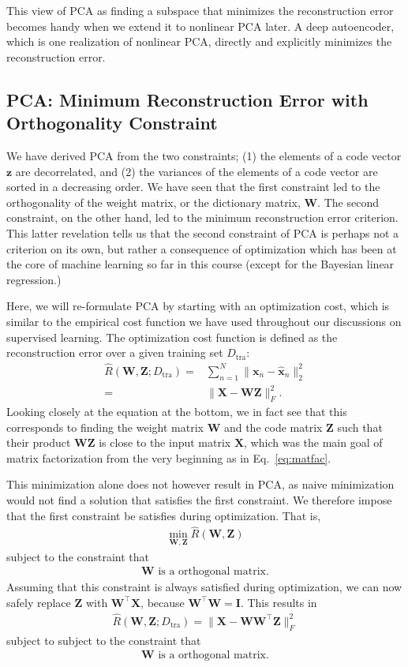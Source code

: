 \documentclass{report}
\newcommand{\vect}[1]{\mathbf{#1}}
\newcommand{\matr}[1]{\mathbf{#1}}
\newcommand{\vx}[0]{\vect{x}}
\newcommand{\vz}[0]{\vect{z}}
\newcommand{\mW}[0]{\matr{W}}
\newcommand{\mZ}[0]{\matr{Z}}
\newcommand{\mX}[0]{\matr{X}}
\newcommand{\mI}{\matr{I}}
\newcommand{\tra}{\text{tra}}
\begin{document}
This view of PCA as finding a subspace that minimizes the reconstruction error
becomes handy when we extend it to nonlinear PCA later. A deep autoencoder,
which is one realization of nonlinear PCA, directly and explicitly minimizes the
reconstruction error.


\subsection{PCA: Minimum Reconstruction Error with Orthogonality Constraint}

We have derived PCA from the two constraints; (1) the elements of a code vector
$\vz$ are decorrelated, and (2) the variances of the elements of a code vector
are sorted in a decreasing order. We have seen that the first constraint led to
the orthogonality of the weight matrix, or the dictionary matrix, $\mW$. The
second constraint, on the other hand, led to the minimum reconstruction error
criterion. This latter revelation tells us that the second constraint of PCA is
perhaps not a criterion on its own, but rather a consequence of optimization
which has been at the core of machine learning so far in this course (except for
the Bayesian linear regression.) 

Here, we will re-formulate PCA by starting with an optimization cost, which
is similar to the empirical cost function we have used throughout our
discussions on supervised learning. The optimization cost function is
defined as the reconstruction error over a given training set $D_{\tra}$:
\begin{align*}
    \hat{R}(\mW, \mZ; D_{\tra}) =& \sum_{n=1}^N \| \vx_n - \hat{\vx}_n
    \|^2_2 \\
    =& \| \mX - \mW \mZ \|_F^2.
\end{align*}
Looking closely at the equation at the bottom, we in fact see that this
corresponds to finding the weight matrix $\mW$ and the code matrix $\mZ$ such
that their product $\mW \mZ$ is close to the input matrix $\mX$, which was the
main goal of matrix factorization from the very beginning as in
Eq.~\eqref{eq:matfac}. 

This minimization alone does not however result in PCA, as naive minimization
would not find a solution that satisfies the first constraint. We therefore
impose that the first constraint be satisfies during optimization. That is, 
\begin{align*}
    \min_{\mW, \mZ} \hat{R}(\mW, \mZ)
\end{align*}
subject to the constraint that
\begin{align*}
    \mW\text{ is a orthogonal matrix}.
\end{align*}
Assuming that this constraint is always satisfied during optimization, we can
now safely replace $\mZ$ with $\mW^\top \mX$, because $\mW^\top \mW = \mI$. This
results in 
\begin{align*}
    \hat{R}(\mW, \mZ; D_{\tra}) 
    = \| \mX - \mW \mW^\top \mZ \|_F^2
\end{align*}
subject to 
subject to the constraint that
\begin{align*}
    \mW\text{ is a orthogonal matrix}.
\end{align*}
\end{document}
